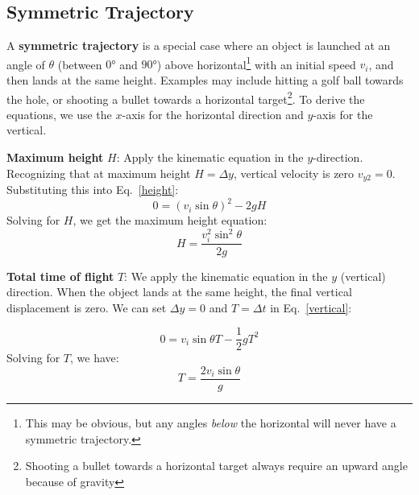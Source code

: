 \subsection{Symmetric Trajectory}

A \textbf{symmetric trajectory} is a special case where an object is launched
at an angle of $\theta$ (between $\ang{0}$ and $\ang{90}$) above
horizontal\footnote{This may be obvious, but any angles \emph{below} the 
horizontal will never have a symmetric trajectory.} with an initial speed
$v_i$, and then lands at the same height. Examples may include hitting a golf
ball towards the hole, or shooting a bullet towards a horizontal
target\footnote{Shooting a bullet towards a horizontal target always require an
upward angle because of gravity}. To derive the equations, we use the $x$-axis
for the horizontal direction and $y$-axis for the vertical.

\textbf{Maximum height} $H$: Apply the kinematic equation in the $y$-direction.
Recognizing that at maximum height $H=\Delta y$, vertical velocity is zero
$v_{y2}=0$. Substituting this into Eq.~\ref{height}:
\begin{equation}
  0 = (v_i\sin\theta)^2-2gH
\end{equation}
Solving for $H$, we get the maximum height equation:
\begin{equation}
  \boxed{H=\frac{v_i^2\sin^2\theta}{2g}}
\end{equation}

\textbf{Total time of flight} $T$: We apply the kinematic equation in the $y$
(vertical) direction. When the object lands at the same height, the final
vertical displacement is zero. We can set $\Delta y=0$ and $T=\Delta t$ in
Eq.~\ref{vertical}:

\begin{equation*}
  0 = v_i\sin\theta T - \frac12 gT^2
\end{equation*}
Solving for $T$, we have:
\begin{equation}
  \boxed{T=\frac{2v_i\sin\theta}g}
  \label{tmax}
\end{equation}


